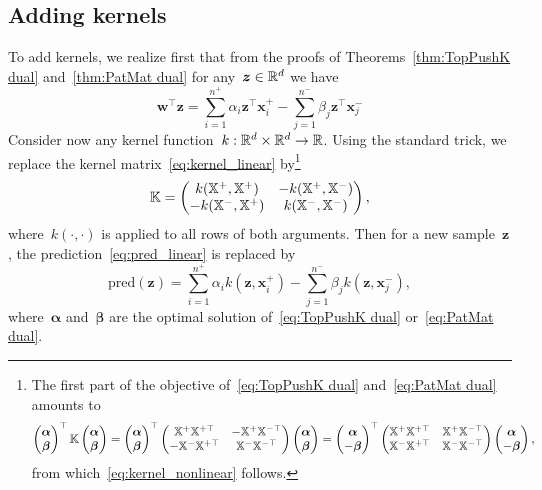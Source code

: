 \subsection{Adding kernels}

To add kernels, we realize first that from the proofs of Theorems~\ref{thm:TopPushK dual} and~\ref{thm:PatMat dual} for any~$\bm{z}\in\mathbb{R}^d$ we have
\begin{equation}\label{eq:pred_linear}
  \bm{w}^\top \bm{z} = \sum_{i = 1}^{n^+} \alpha_i \bm{z}^\top \bm{x}^+_i - \sum_{j = 1}^{n^-} \beta_j \bm{z}^\top \bm{x}^-_j
\end{equation}
Consider now any kernel function~$k:\mathbb{R}^d\times\mathbb{R}^d\to\mathbb{R}$. Using the standard trick, we replace the kernel matrix~\eqref{eq:kernel_linear} by\footnote{
The first part of the objective of~\eqref{eq:TopPushK dual} and~\eqref{eq:PatMat dual} amounts to
\begin{equation*}
  \begin{pmatrix} \bm{\alpha} \\ \bm{\beta} \end{pmatrix}^\top \mathbb{K} \begin{pmatrix} \bm{\alpha} \\ \bm{\beta} \end{pmatrix}
  = \begin{pmatrix} \bm{\alpha} \\ \bm{\beta} \end{pmatrix}^\top \begin{pmatrix} \mathbb{X}^+ \mathbb{X}^{+\top} & -\mathbb{X}^+ \mathbb{X}^{-\top} \\ -\mathbb{X}^- \mathbb{X}^{+\top} & \mathbb{X}^- \mathbb{X}^{-\top}  \end{pmatrix}\begin{pmatrix} \bm{\alpha} \\ \bm{\beta} \end{pmatrix}
  = \begin{pmatrix} \bm{\alpha} \\ -\bm{\beta} \end{pmatrix}^\top \begin{pmatrix} \mathbb{X}^+ \mathbb{X}^{+\top} & \mathbb{X}^+ \mathbb{X}^{-\top} \\ \mathbb{X}^- \mathbb{X}^{+\top} & \mathbb{X}^- \mathbb{X}^{-\top}  \end{pmatrix}\begin{pmatrix} \bm{\alpha} \\ -\bm{\beta} \end{pmatrix},
\end{equation*}
from which~\eqref{eq:kernel_nonlinear} follows.}
\begin{equation}\label{eq:kernel_nonlinear}
  \mathbb{K} = \begin{pmatrix} k(\mathbb{X}^+, \mathbb{X}^{+}) & -k(\mathbb{X}^+, \mathbb{X}^{-}) \\ -k(\mathbb{X}^-, \mathbb{X}^{+}) & k(\mathbb{X}^-, \mathbb{X}^{-})  \end{pmatrix},
\end{equation}
where~$k(\cdot,\cdot)$ is applied to all rows of both arguments. Then for a new sample~$\bm{z}$, the prediction~\eqref{eq:pred_linear} is replaced by
\begin{equation}\label{eq:pred_nonlinear}
  \textrm{pred}(\bm{z}) = \sum_{i = 1}^{n^+} \alpha_i k\left(\bm{z}, \bm{x}^+_i\right) - \sum_{j = 1}^{n^-} \beta_j k\left(\bm{z}, \bm{x}^-_j\right),
\end{equation}
where~$\bm{\alpha}$ and~$\bm{\beta}$ are the optimal solution of~\eqref{eq:TopPushK dual} or~\eqref{eq:PatMat dual}.

